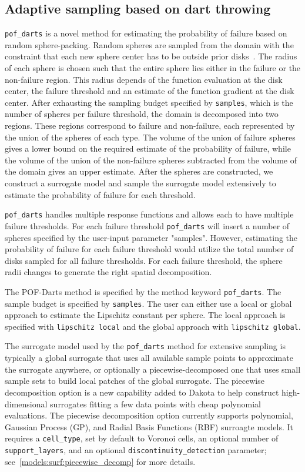 \subsection{Adaptive sampling based on dart throwing}\label{uq:adaptive:darts}
\texttt{pof\_darts} is a novel method for estimating the probability of failure based on random sphere-packing. Random spheres are sampled from the domain with the constraint that each new sphere center has to be outside prior disks~\cite{Ebeida14}. The radius of each sphere is chosen such that the entire sphere lies either in the failure or the non-failure region. This radius depends of the function evaluation at the disk center, the failure threshold and an estimate of the function gradient at the disk center. 
After exhausting the sampling budget specified by \texttt{samples}, which is the number of spheres per failure threshold, the domain is decomposed into two regions.  These regions correspond to failure and non-failure, each represented by the union of the spheres of each type. The volume of the union of failure spheres gives a lower bound on the required estimate of the probability of failure, while the volume of the union of the non-failure spheres subtracted from the volume of the domain gives an upper estimate. 
After the spheres are constructed, we construct a surrogate model and sample the surrogate model extensively to estimate the probability of failure for each threshold. 

\texttt{pof\_darts} handles multiple response functions and allows each to have multiple failure thresholds. For each failure threshold \texttt{pof\_darts} will insert a number of spheres specified by the user-input parameter "samples". However, estimating the probability of failure for each failure threshold would utilize the total number of disks sampled for all failure thresholds. For each failure threshold, the sphere radii changes to generate the right spatial decomposition.

The POF-Darts method is specified by the method keyword 
\texttt{pof\_darts}. The sample budget is specified by \texttt{samples}.
The user can either use a local or global approach to estimate the Lipschitz constant per sphere. 
The local approach is specified with \texttt{lipschitz local} and the global approach with \texttt{lipschitz global}. 

The surrogate model used by the \texttt{pof\_darts} method for extensive sampling is typically a global surrogate that uses all available sample points to approximate the surrogate anywhere, or optionally a piecewise-decomposed one that uses small sample sets to build local patches of the global surrogate. The piecewise decomposition option is a new capability added to Dakota to help construct high-dimensional surrogates fitting a few data points with cheap polynomial evaluations. The piecewise decomposition option currently supports polynomial, Gaussian Process (GP), and Radial Basis Functions (RBF) surroagte models. It requires a \texttt{cell\_type}, set by default to Voronoi cells, an optional number of \texttt{support\_layers}, and an optional \texttt{discontinuity\_detection} parameter; see~\ref{models:surf:piecewise_decomp} for more details.

